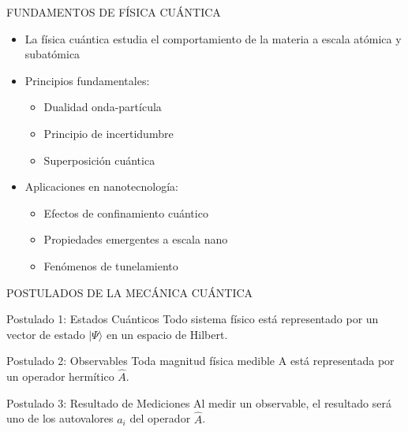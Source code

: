 \documentclass[aspectratio=169]{beamer} %
\begin{document}
	\begin{frame}{FUNDAMENTOS DE FÍSICA CUÁNTICA}
		\begin{itemize}
			\item La física cuántica estudia el comportamiento de la materia a escala atómica y subatómica
			\item Principios fundamentales:
			\begin{itemize}
				\item Dualidad onda-partícula
				\item Principio de incertidumbre
				\item Superposición cuántica
			\end{itemize}
			\item Aplicaciones en nanotecnología:
			\begin{itemize}
				\item Efectos de confinamiento cuántico
				\item Propiedades emergentes a escala nano
				\item Fenómenos de tunelamiento
			\end{itemize}
		\end{itemize}
	\end{frame}
	
	\begin{frame}{POSTULADOS DE LA MECÁNICA CUÁNTICA}
		\begin{block}{Postulado 1: Estados Cuánticos}
			Todo sistema físico está representado por un vector de estado $|\Psi\rangle$ en un espacio de Hilbert.
		\end{block}
		
		\begin{block}{Postulado 2: Observables}
			Toda magnitud física medible A está representada por un operador hermítico $\hat{A}$.
		\end{block}
		
		\begin{block}{Postulado 3: Resultado de Mediciones}
			Al medir un observable, el resultado será uno de los autovalores $a_i$ del operador $\hat{A}$.
		\end{block}
	\end{frame}
	
\end{document}
